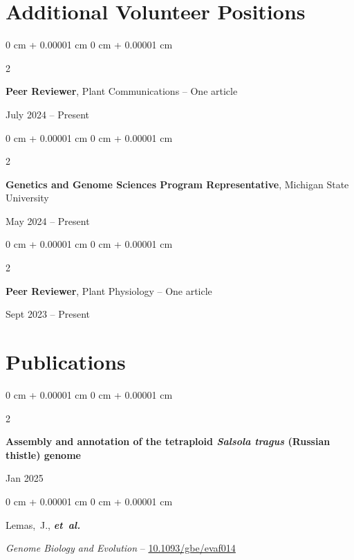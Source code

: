 \documentclass[10pt, letterpaper]{article}
\newenvironment{onecolentry}{
    \begin{adjustwidth}{
        0 cm + 0.00001 cm
    }{
        0 cm + 0.00001 cm
    }
}{
    \end{adjustwidth}
} %
\newenvironment{twocolentry}[2][]{
    \onecolentry
    \def\secondColumn{#2}
    \setcolumnwidth{\fill, 4.5 cm}
    \begin{paracol}{2}
}{
    \switchcolumn \raggedleft \secondColumn
    \end{paracol}
    \endonecolentry
} %
\begin{document}
    \section{Additional Volunteer Positions}




        \begin{samepage} 
            \begin{twocolentry}{
                July 2024 – Present
                }
                \textbf{Peer Reviewer}, Plant Communications -- One article
            \end{twocolentry}
        \end{samepage} 


        \vspace{0.2 cm} 

        
        \begin{samepage} 
            \begin{twocolentry}{
                May 2024 – Present
                }
                \textbf{Genetics and Genome Sciences Program Representative}, Michigan State University
            \end{twocolentry}
        \end{samepage}  


        \vspace{0.2 cm}


        \begin{samepage} 
            \begin{twocolentry}{
                Sept 2023 – Present
                }
                \textbf{Peer Reviewer}, Plant Physiology -- One article
            \end{twocolentry}
        \end{samepage}
      
        

            
    \section{Publications}





        \begin{samepage}
            \begin{twocolentry}{
                Jan 2025
                }
                \textbf{Assembly and annotation of the tetraploid \textit{Salsola tragus} (Russian thistle) genome}
            \end{twocolentry}

            \vspace{0.10 cm}
            
            \begin{onecolentry}
                \mbox{Lemas, J.}, \mbox{\textbf{\textit{et al.}}}

                \vspace{0.10 cm}
                
                \textit{Genome Biology and Evolution} -- \href{https://doi.org/10.1093/gbe/evaf014}{10.1093/gbe/evaf014}
            \end{onecolentry}
        \end{samepage}
\end{document}
